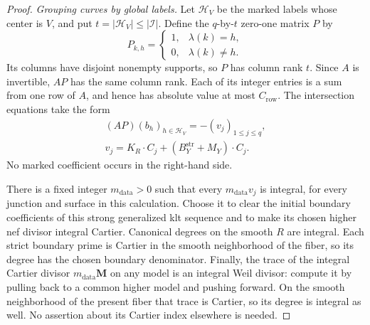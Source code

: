 \documentclass[11pt]{amsart}
\theoremstyle{definition}
\theoremstyle{remark}
\numberwithin{equation}{section}
\newcommand{\M}{\mathbf{M}}
\begin{document}
\begin{proof}
\medskip\noindent\emph{Grouping curves by global labels.}
Let $\mathcal H_V$ be the marked labels whose center is $V$, and put
$t=|\mathcal H_V|\leq|\mathcal I|$.  Define the $q$-by-$t$ zero-one
matrix $P$ by
\[
             P_{k,h}=\begin{cases}1,&\lambda(k)=h,\\0,&\lambda(k)\ne h.
                         \end{cases}
\]
Its columns have disjoint nonempty supports, so $P$ has column rank $t$.
Since $A$ is invertible, $AP$ has the same column rank.  Each of its
integer entries is a sum from one row of $A$, and hence has absolute
value at most $C_{\mathrm{row}}$.  The intersection equations take the
form
\begin{equation}\label{eq:grouped-surface-equations}
 \begin{gathered}
                  (AP)(b_h)_{h\in\mathcal H_V}=-(v_j)_{1\leq j\leq q},
 \\
 v_j=K_R\cdot C_j+(B_Y^{\mathrm{str}}+M_Y)\cdot C_j.
 \end{gathered}
\end{equation}
No marked coefficient occurs in the right-hand side.

There is a fixed integer $m_{\mathrm{data}}>0$ such that every
$m_{\mathrm{data}}v_j$ is integral, for every junction and surface in
this calculation.  Choose it to clear the initial boundary coefficients
of this strong generalized klt sequence and to make its chosen higher nef
divisor integral Cartier.  Canonical
degrees on the smooth $R$ are integral.  Each strict boundary prime is
Cartier in the smooth neighborhood of the fiber, so its degree has the
chosen boundary denominator.  Finally, the trace of the integral Cartier
divisor $m_{\mathrm{data}}\M$ on any model is an integral Weil divisor:
compute it by pulling back to a common higher model and pushing forward.
On the smooth neighborhood of the present fiber that trace is Cartier,
so its degree is integral as well.  No assertion about its Cartier index
elsewhere is needed.


\end{proof}
\end{document}
